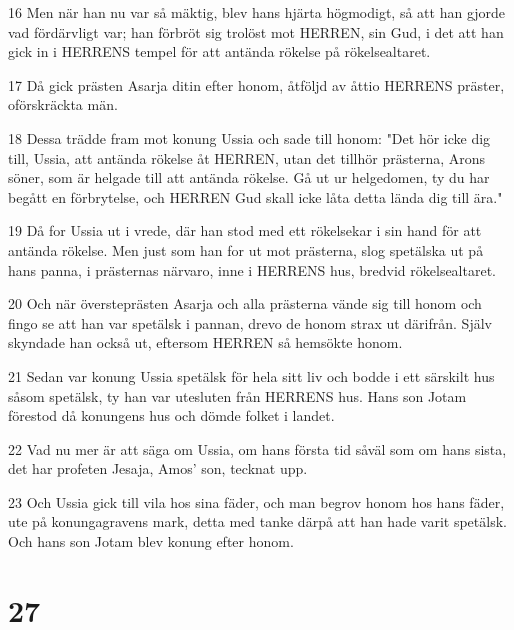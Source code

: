 \par 16 Men när han nu var så mäktig, blev hans hjärta högmodigt, så att han gjorde vad fördärvligt var; han förbröt sig trolöst mot HERREN, sin Gud, i det att han gick in i HERRENS tempel för att antända rökelse på rökelsealtaret.
\par 17 Då gick prästen Asarja ditin efter honom, åtföljd av åttio HERRENS präster, oförskräckta män.
\par 18 Dessa trädde fram mot konung Ussia och sade till honom: "Det hör icke dig till, Ussia, att antända rökelse åt HERREN, utan det tillhör prästerna, Arons söner, som är helgade till att antända rökelse. Gå ut ur helgedomen, ty du har begått en förbrytelse, och HERREN Gud skall icke låta detta lända dig till ära."
\par 19 Då for Ussia ut i vrede, där han stod med ett rökelsekar i sin hand för att antända rökelse. Men just som han for ut mot prästerna, slog spetälska ut på hans panna, i prästernas närvaro, inne i HERRENS hus, bredvid rökelsealtaret.
\par 20 Och när översteprästen Asarja och alla prästerna vände sig till honom och fingo se att han var spetälsk i pannan, drevo de honom strax ut därifrån. Själv skyndade han också ut, eftersom HERREN så hemsökte honom.
\par 21 Sedan var konung Ussia spetälsk för hela sitt liv och bodde i ett särskilt hus såsom spetälsk, ty han var utesluten från HERRENS hus. Hans son Jotam förestod då konungens hus och dömde folket i landet.
\par 22 Vad nu mer är att säga om Ussia, om hans första tid såväl som om hans sista, det har profeten Jesaja, Amos' son, tecknat upp.
\par 23 Och Ussia gick till vila hos sina fäder, och man begrov honom hos hans fäder, ute på konungagravens mark, detta med tanke därpå att han hade varit spetälsk. Och hans son Jotam blev konung efter honom.

\chapter{27}

